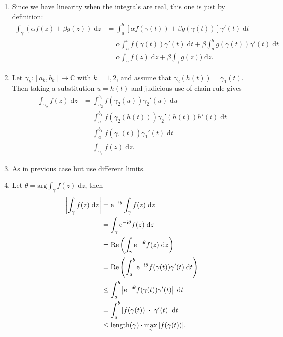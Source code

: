 \documentclass[letter-paper]{tufte-book}
\newenvironment{proof}[1][Proof]{\begin{trivlist}
\item[\hskip \labelsep {\bfseries #1}]}{\end{trivlist}}
\newcommand{\ex}{\mathrm{e}}
\newcommand{\zi}{{\rm i}}
\begin{document}
\begin{proof}
  \begin{enumerate}
    \item Since we have linearity when the integrals are real, this one is just
    by definition:
    \begin{align*}
      \int_\gamma (\alpha f(z) + \beta g(z))\; \mathrm{d}z 
        &= \int^b_a [\alpha f(\gamma(t)) + \beta g(\gamma(t))]\gamma'(t)\; \mathrm{d}t\\
        &= \alpha \int^b_a f(\gamma(t)) \gamma'(t)\; \mathrm{d}t + \beta \int^b_a g(\gamma(t)) \gamma'(t)\; \mathrm{d}t\\
        & =\alpha \int_\gamma f(z)\; \mathrm{d}z + \beta \int_\gamma g(z))\; \mathrm{d}z.
    \end{align*}
    
    \item Let $\gamma_k : [a_k, b_k] \to \mathbb{C}$ with $k=1,2$, and assume
    that $\gamma_2(h(t)) = \gamma_1(t)$. Then taking a substitution $u = h(t)$
    and judicious use of chain rule gives
    \begin{align*}
      \int_{\gamma_2} f(z)\; \mathrm{d}z &= \int^{b_2}_{a_2} f(\gamma_2(u)) \gamma_2'(u)\; \mathrm{d}u \\
      &= \int^{b_1}_{a_1} f(\gamma_2(h(t))) \gamma_2'(h(t)) h'(t)\; \mathrm{d}t \\
      &= \int^{b_1}_{a_1} f(\gamma_1(t)) \gamma_1'(t)\; \mathrm{d}t \\
      &= \int_{\gamma_1} f(z)\; \mathrm{d}z.
    \end{align*}
    
    \item As in previous case but use different limits.
    
    \item Let $\theta = \mbox{arg} \int_\gamma f(z)\; \mathrm{d}z$, then
    \begin{align*}
      \left|\int_\gamma f(z)\; \mathrm{d}z\right| &= \ex^{-\zi \theta} \int_\gamma f(z)\; \mathrm{d}z \\
      &= \int_\gamma \ex^{-\zi \theta} f(z)\; \mathrm{d}z \\
      &= \mbox{Re} \left(\int_\gamma \ex^{-\zi \theta} f(z)\; \mathrm{d}z\right) \\
      &= \mbox{Re} \left(\int^b_a \ex^{-\zi \theta} f(\gamma(t)) \gamma'(t)\; \mathrm{d}t\right)\\
      &\leq \int^b_a \left|\ex^{-\zi \theta} f(\gamma(t)) \gamma'(t)\right|\; \mathrm{d}t \\
      &= \int^b_a |f(\gamma(t))| \cdot |\gamma'(t)|\; \mathrm{d}t\\
      &\leq \textnormal{length}(\gamma) \cdot \max_{\gamma} |f(\gamma(t))|.
    \end{align*}
    

\end{enumerate}
\end{proof}
\end{document}

